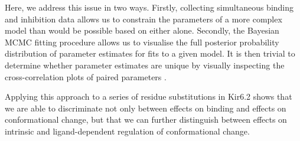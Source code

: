 Here, we address this issue in two ways.
Firstly, collecting simultaneous binding and inhibition data allows us to constrain the parameters of a more complex model than would be possible based on either alone.
Secondly, the Bayesian MCMC fitting procedure allows us to visualise the full posterior probability distribution of parameter estimates for fits to a given model.
It is then trivial to determine whether parameter estimates are unique by visually inspecting the cross-correlation plots of paired parameters \cite{hines_determination_2014-1}.

Applying this approach to a series of residue substitutions in Kir6.2 shows that we are able to discriminate not only between effects on binding and effects on conformational change, but that we can further distinguish between effects on intrinsic and ligand-dependent regulation of conformational change.

